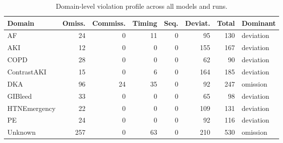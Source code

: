 \begin{table}[htbp]
\centering
\caption{Domain-level violation profile across all models and runs.}
\label{tab:domain_violation_profile}
\begin{tabular}{l r r r r r r l}
\toprule
\textbf{Domain} & \textbf{Omiss.} & \textbf{Commiss.} & \textbf{Timing} & \textbf{Seq.} & \textbf{Deviat.} & \textbf{Total} & \textbf{Dominant} \\
\midrule
AF & 24 & 0 & 11 & 0 & 95 & 130 & deviation \\
AKI & 12 & 0 & 0 & 0 & 155 & 167 & deviation \\
COPD & 28 & 0 & 0 & 0 & 62 & 90 & deviation \\
ContrastAKI & 15 & 0 & 6 & 0 & 164 & 185 & deviation \\
DKA & 96 & 24 & 35 & 0 & 92 & 247 & omission \\
GIBleed & 33 & 0 & 0 & 0 & 65 & 98 & deviation \\
HTNEmergency & 22 & 0 & 0 & 0 & 109 & 131 & deviation \\
PE & 24 & 0 & 0 & 0 & 92 & 116 & deviation \\
Unknown & 257 & 0 & 63 & 0 & 210 & 530 & omission \\
\bottomrule
\end{tabular}
\end{table}